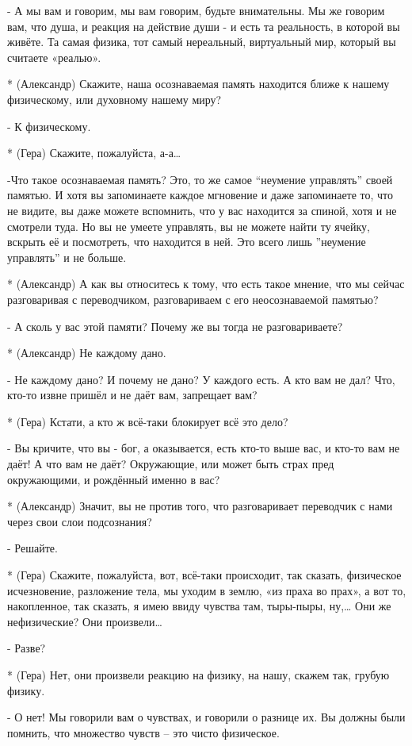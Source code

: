 - А мы вам и говорим, мы вам говорим, будьте внимательны. Мы же говорим вам, что душа, и реакция на действие души - и есть та реальность, в которой вы живёте. Та самая физика, тот самый нереальный, виртуальный мир, который вы считаете «реалью».

* (Александр) Скажите, наша осознаваемая память находится ближе к нашему физическому, или духовному нашему миру?

- К физическому. 

* (Гера) Скажите, пожалуйста, а-а…

-Что такое осознаваемая память? Это, то же самое “неумение управлять” своей памятью. И хотя вы запоминаете каждое мгновение и даже запоминаете то, что не видите, вы даже можете вспомнить, что у вас находится за спиной, хотя и не смотрели туда. Но вы не умеете управлять, вы не можете найти ту ячейку, вскрыть её и посмотреть, что находится в ней. Это всего лишь ”неумение управлять” и не больше.

* (Александр) А как вы относитесь к тому, что есть такое мнение, что мы сейчас разговаривая с переводчиком, разговариваем с его неосознаваемой памятью?

- А сколь у вас этой памяти? Почему же вы тогда не разговариваете?

* (Александр) Не каждому дано.

- Не каждому дано? И почему не дано? У каждого есть. А кто вам не дал? Что,  кто-то извне пришёл и не даёт вам, запрещает вам? 

* (Гера) Кстати, а кто ж всё-таки блокирует всё это дело?

- Вы кричите, что вы - бог, а оказывается, есть кто-то выше вас, и кто-то вам не даёт! А что вам не даёт? Окружающие, или может быть страх пред окружающими, и рождённый именно в вас?

* (Александр) Значит, вы не против того, что разговаривает переводчик с нами через свои слои подсознания?

- Решайте.

* (Гера) Скажите, пожалуйста, вот, всё-таки происходит, так сказать, физическое исчезновение, разложение тела, мы уходим в землю, «из праха во прах», а вот то, накопленное, так сказать, я имею ввиду чувства там, тыры-пыры, ну,… Они же нефизические? Они произвели…

-  Разве?

* (Гера) Нет, они произвели реакцию на физику, на нашу, скажем так, грубую физику.

- О нет! Мы говорили вам о чувствах, и говорили о разнице их. Вы должны были помнить, что множество чувств – это чисто физическое.

